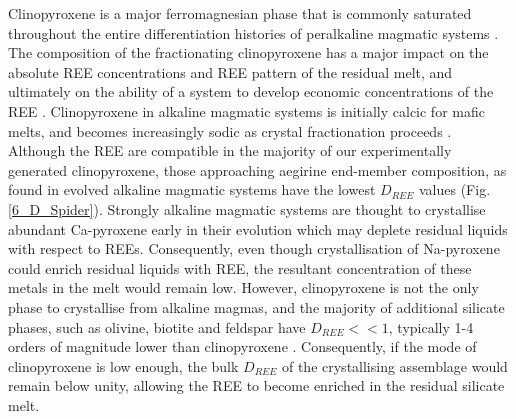 \documentclass[review,authoryear,12pt]{elsarticle}
\begin{document}
	Clinopyroxene is a major ferromagnesian phase that is commonly saturated throughout the entire differentiation histories of peralkaline magmatic systems \citep{Ablay1998,Marks2001a,Moller2016}. The composition of the fractionating clinopyroxene has a major impact on the absolute REE concentrations and REE pattern of the residual melt, and ultimately on the ability of a system to develop economic concentrations of the REE \citep[Fig. \ref{15_Fract_Cryst}, e.g.][]{Kogarko1990, Sorensen1992, Marks2011}.
Clinopyroxene in alkaline magmatic systems is initially calcic for mafic melts, and becomes increasingly sodic as crystal fractionation proceeds \citep{Marks2004}. Although the REE are compatible in the majority of our experimentally generated clinopyroxene, those approaching aegirine end-member composition, as found in evolved alkaline magmatic systems have the lowest $D_{REE}$ values (Fig. \ref{6_D_Spider}). Strongly alkaline magmatic systems are thought to crystallise abundant Ca-pyroxene early in their evolution which may deplete residual liquids with respect to REEs. Consequently, even though crystallisation of Na-pyroxene could enrich residual liquids with REE, the resultant concentration of these metals in the melt would remain low. 
    However, clinopyroxene is not the only phase to crystallise from alkaline magmas, and the majority of additional silicate phases, such as olivine, biotite and feldspar have $D_{REE} << 1$, typically 1-4 orders of magnitude lower than clinopyroxene \citep{Larsen1979,Kovalenko1988, Mahood1990,Fedele2015}.
     Consequently, if the mode of clinopyroxene is low enough, the bulk $D_{REE}$ of the crystallising assemblage would remain below unity, allowing the REE to become enriched in the residual silicate melt.


\end{document}
